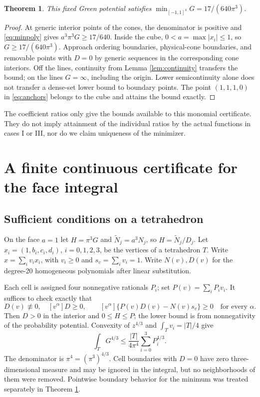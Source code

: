 \documentclass[11pt,a4paper]{article}
\newtheorem{theorem}{Theorem}[section]
\theoremstyle{remark}\newtheorem{remark}[theorem]{Remark}
\newcommand{\1}{\mathbf1}\newcommand{\pos}[1]{(#1)_+}
\begin{document}
\begin{theorem}\label{thm:min}
This fixed Green potential satisfies $\min_{[-1,1]^4}G=17/(640\pi^3)$.
\end{theorem}
\begin{proof}
At generic interior points of the cones, the denominator is positive and \eqref{eq:minpoly} gives $a^3\pi^3G\ge17/640$. Inside the cube, $0<a=\max|x_i|\le1$, so $G\ge17/(640\pi^3)$. Approach ordering boundaries, physical-cone boundaries, and removable points with $D=0$ by generic sequences in the corresponding cone interiors. Off the lines, continuity from Lemma \ref{lem:continuity} transfers the bound; on the lines $G=\infty$, including the origin. Lower semicontinuity alone does not transfer a dense-set lower bound to boundary points. The point $(1,1,1,0)$ in \eqref{eq:anchors} belongs to the cube and attains the bound exactly.
\end{proof}
The coefficient ratios only give the bounds available to this monomial certificate. They do not imply attainment of the individual ratios by the actual functions in cases I or III, nor do we claim uniqueness of the minimizer.

\section{A finite continuous certificate for the face integral}
\subsection{Sufficient conditions on a tetrahedron}
On the face $a=1$ let $H=\pi^3G$ and $\widetilde N_j=a^3N_j$, so $H=\widetilde N_j/D_j$. Let $x_i=(1,b_i,c_i,d_i)$, $i=0,1,2,3$, be the vertices of a tetrahedron $T$. Write $x=\sum_i v_ix_i$, with $v_i\ge0$ and $s_v=\sum_i v_i=1$. Write $N(v),D(v)$ for the degree-20 homogeneous polynomials after linear substitution.

Each cell is assigned four nonnegative rationals $P_i$; set $P(v)=\sum_iP_iv_i$. It suffices to check exactly that
\begin{equation}\label{eq:residual}
 D(v)\not\equiv0,\quad [v^\alpha]D\ge0,\qquad
 [v^\alpha]\{P(v)D(v)-N(v)s_v\}\ge0\quad\text{for every }\alpha.
\end{equation}
Then $D>0$ in the interior and $0\le H\le P$; the lower bound is from nonnegativity of the probability potential. Convexity of $z^{4/3}$ and $\int_Tv_i=|T|/4$ give
\begin{equation}\label{eq:tetbudget}
 \int_TG^{4/3}\le\frac{|T|}{4\pi^4}\sum_{i=0}^3P_i^{4/3}.
\end{equation}
The denominator is $\pi^4=(\pi^3)^{4/3}$. Cell boundaries with $D=0$ have zero three-dimensional measure and may be ignored in the integral, but no neighborhoods of them were removed. Pointwise boundary behavior for the minimum was treated separately in Theorem \ref{thm:min}.
\end{document}
